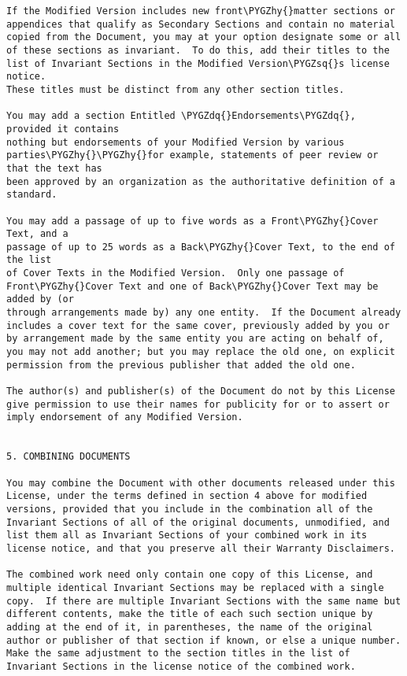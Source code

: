 \documentclass[letterpaper,10pt,english]{sphinxmanual}
\def\PYGZhy{\char`\-}
\def\PYGZsq{\char`\'}
\def\PYGZdq{\char`\"}
\renewcommand\PYGZsq{\textquotesingle}
\begin{document}
\begin{Verbatim}[frame=single,commandchars=\\\{\}]
If the Modified Version includes new front\PYGZhy{}matter sections or
appendices that qualify as Secondary Sections and contain no material
copied from the Document, you may at your option designate some or all
of these sections as invariant.  To do this, add their titles to the
list of Invariant Sections in the Modified Version\PYGZsq{}s license notice.
These titles must be distinct from any other section titles.

You may add a section Entitled \PYGZdq{}Endorsements\PYGZdq{}, provided it contains
nothing but endorsements of your Modified Version by various
parties\PYGZhy{}\PYGZhy{}for example, statements of peer review or that the text has
been approved by an organization as the authoritative definition of a
standard.

You may add a passage of up to five words as a Front\PYGZhy{}Cover Text, and a
passage of up to 25 words as a Back\PYGZhy{}Cover Text, to the end of the list
of Cover Texts in the Modified Version.  Only one passage of
Front\PYGZhy{}Cover Text and one of Back\PYGZhy{}Cover Text may be added by (or
through arrangements made by) any one entity.  If the Document already
includes a cover text for the same cover, previously added by you or
by arrangement made by the same entity you are acting on behalf of,
you may not add another; but you may replace the old one, on explicit
permission from the previous publisher that added the old one.

The author(s) and publisher(s) of the Document do not by this License
give permission to use their names for publicity for or to assert or
imply endorsement of any Modified Version.


5. COMBINING DOCUMENTS

You may combine the Document with other documents released under this
License, under the terms defined in section 4 above for modified
versions, provided that you include in the combination all of the
Invariant Sections of all of the original documents, unmodified, and
list them all as Invariant Sections of your combined work in its
license notice, and that you preserve all their Warranty Disclaimers.

The combined work need only contain one copy of this License, and
multiple identical Invariant Sections may be replaced with a single
copy.  If there are multiple Invariant Sections with the same name but
different contents, make the title of each such section unique by
adding at the end of it, in parentheses, the name of the original
author or publisher of that section if known, or else a unique number.
Make the same adjustment to the section titles in the list of
Invariant Sections in the license notice of the combined work.


\end{Verbatim}
\end{document}
